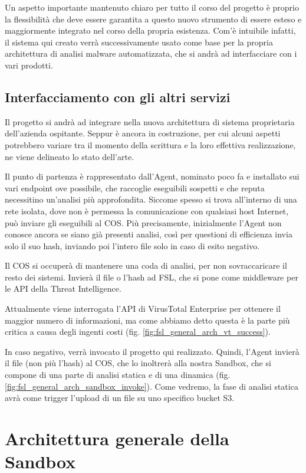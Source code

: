 Un aspetto importante mantenuto chiaro per tutto il corso del progetto è proprio la flessibilità che deve essere garantita a questo nuovo strumento di essere esteso e maggiormente integrato nel corso della propria esistenza. Com'è intuibile infatti, il sistema qui creato verrà successivamente usato come base per la propria architettura di analisi malware automatizzata, che si andrà ad interfacciare con i vari prodotti.

\subsection{Interfacciamento con gli altri servizi}

Il progetto si andrà ad integrare nella nuova architettura di sistema proprietaria dell'azienda ospitante.
Seppur è ancora in costruzione, per cui alcuni aspetti potrebbero variare tra il momento della scrittura e la loro effettiva realizzazione, ne viene delineato lo stato dell'arte.

Il punto di partenza è rappresentato dall'Agent, nominato poco fa e installato sui vari endpoint ove possibile, che raccoglie eseguibili sospetti e che reputa necessitino un'analisi più approfondita.
Siccome spesso si trova all'interno di una rete isolata, dove non è permessa la comunicazione con qualsiasi host Internet, può inviare gli eseguibili al COS. Più precisamente, inizialmente l'Agent non conosce ancora se siano già presenti analisi, così per questioni di efficienza invia solo il suo hash, inviando poi l'intero file solo in caso di esito negativo.

Il COS si occuperà di mantenere una coda di analisi, per non sovraccaricare il resto dei sistemi.
Invierà il file o l'hash ad FSL, che si pone come middleware per le API della Threat Intelligence.

Attualmente viene interrogata l'API di VirusTotal Enterprise per ottenere il maggior numero di informazioni, ma come abbiamo detto questa è la parte più critica a causa degli ingenti costi (fig. \ref{fig:fsl_general_arch_vt_success}).

In caso negativo, verrà invocato il progetto qui realizzato. Quindi, l'Agent invierà il file (non più l'hash) al COS, che lo inoltrerà alla nostra Sandbox, che si compone di una parte di analisi statica e di una dinamica (fig. \ref{fig:fsl_general_arch_sandbox_invoke}). Come vedremo, la fase di analisi statica avrà come trigger l'upload di un file su uno specifico bucket S3.

\section{Architettura generale della Sandbox}

